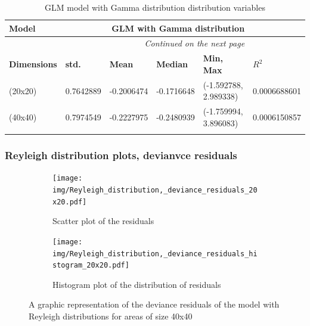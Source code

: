 \documentclass[12pt,a4paper,twoside]{article}
\begin{document}
\begin{longtable}{l|p{}|p{}|p{}|p{}|p{}}
    \textbf{Model}      & \multicolumn{4}{r}{GLM with Gamma distribution }                                                                                         \\
    \hline
    \endhead
    \hline
    \multicolumn{5}{r}{\emph{Continued on the next page}}                                                                                                          \\
    \endfoot
    \hline
    \endlastfoot
    \hline
    \textbf{Dimensions} & \textbf{std.}                                    & \textbf{Mean}     & \textbf{Median}   & \textbf{Min, Max}            & \textbf{$R^2$} \\
    \hline
    (20x20)             & \small 0.7642889                                 & \small -0.2006474 & \small -0.1716648 & \small (-1.592788, 2.989338) & 0.0006688601   \\
    \hline
    (40x40)             & \small 0.7974549                                 & \small -0.2227975 & \small -0.2480939 & \small (-1.759994, 3.896083) & 0.0006150857   \\
    \caption{GLM model with Gamma distribution distribution variables}
    \label{tab:gammavaltab}
\end{longtable}

\newpage

\subsubsection{Reyleigh distribution plots, devianvce residuals}
\label{sssec:reyleighdeviance}
\begin{figure}[!ht]
    \begin{subfigure}{.45\textwidth}
        \centering
        \texttt{[image: img/Reyleigh\_distribution,\_deviance\_residuals\_20x20.pdf]}
        \caption{Scatter plot of the residuals}
        \label{fig:reyleighdeviancescatter20}
    \end{subfigure}
    \begin{subfigure}{.45\textwidth}
        \centering
        \texttt{[image: img/Reyleigh\_distribution,\_deviance\_residuals\_histogram\_20x20.pdf]}
        \caption{Histogram plot of the distribution of residuals}
        \label{fig:reyleighdeviancehist20}
    \end{subfigure}
    \caption{A graphic representation of the deviance residuals of the model with Reyleigh
        distributions for areas of size 40x40}
    \label{fig:reyleighdeviancefig20}
\end{figure}
\end{document}
